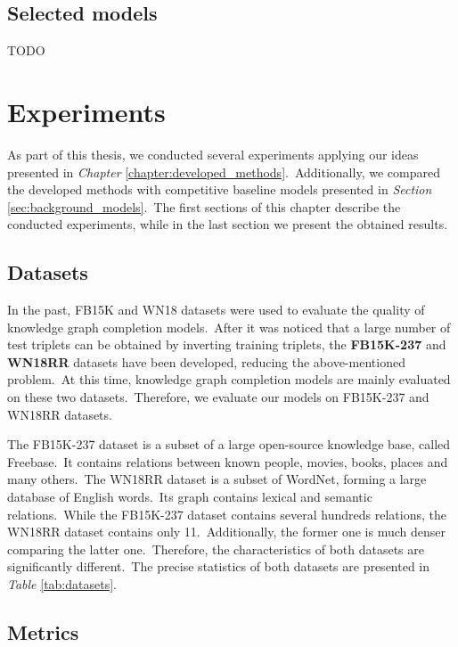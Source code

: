 \documentclass[longabstract, english, mgr]{iithesis}
\newcommand\numberedchapter[1]{\setlength\topskip{3cm}\chapter{#1}\setlength\topskip{0cm}}
\theoremstyle{default_theorem_style}\newtheorem{theorem}{Theorem}
\theoremstyle{default_theorem_style}\newtheorem{definition}{Definition}
\begin{document}
\section{Selected models}\label{sec:selected_models}

TODO

\numberedchapter{Experiments}\label{chapter:experiments}

As part of this thesis, we conducted several experiments applying our ideas presented in
\textit{Chapter} \ref{chapter:developed_methods}.\ Additionally, we compared the developed methods with competitive
baseline models presented in \textit{Section} \ref{sec:background_models}.\ The first sections of this chapter describe
the conducted experiments, while in the last section we present the obtained results.

\section{Datasets}

In the past, FB15K and WN18 datasets were used to evaluate the quality of knowledge graph completion models.\ After
it was noticed that a large number of test triplets can be obtained by inverting training triplets, the
\textbf{FB15K-237} and \textbf{WN18RR} datasets have been developed, reducing the above-mentioned problem.\ At this
time, knowledge graph completion models are mainly evaluated on these two datasets.\ Therefore, we evaluate our models
on FB15K-237 and WN18RR datasets.\newline

\noindent The FB15K-237 dataset is a subset of a large open-source knowledge base, called Freebase.\ It contains
relations between known people, movies, books, places and many others.\ The WN18RR dataset is a subset of WordNet,
forming a large database of English words.\ Its graph contains lexical and semantic relations.\ While the FB15K-237
dataset contains several hundreds relations, the WN18RR dataset contains only 11.\ Additionally, the former
one is much denser comparing the latter one.\ Therefore, the characteristics of both datasets are significantly
different.\ The precise statistics of both datasets are presented in \textit{Table} \ref{tab:datasets}.

\section{Metrics} \label{sec:metrics}
\end{document}

